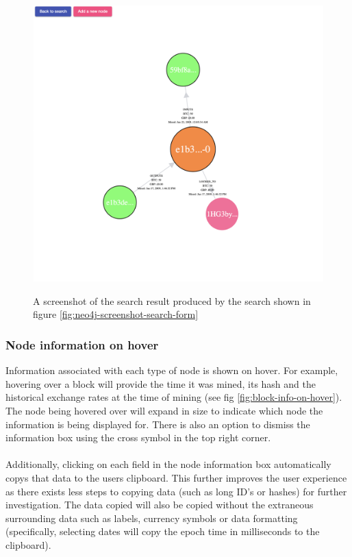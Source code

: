 \begin{figure}[h!]
  \centering
  \includegraphics[width = 15cm]{./figures/ui-screenshots/graph-basic}\\[0.5cm] 
  \caption{A screenshot of the search result produced by the search shown in figure \ref{fig:neo4j-screenshot-search-form}}
  \label{fig:neo4j-screenshot-basic-address-nodes}
\end{figure}

\subsubsection{Node information on hover}
Information associated with each type of node is shown on hover. For example, hovering over a block will provide the time it was mined, its hash and the historical exchange rates at the time of mining (see fig \ref{fig:block-info-on-hover}). The node being hovered over will expand in size to indicate which node the information is being displayed for. There is also an option to dismiss the information box using the cross symbol in the top right corner. 
\\\\
Additionally, clicking on each field in the node information box automatically copys that data to the users clipboard. This further improves the user experience as there exists less steps to copying data (such as long ID's or hashes) for further investigation. The data copied will also be copied without the extraneous surrounding data such as labels, currency symbols or data formatting (specifically, selecting dates will copy the epoch time in milliseconds to the clipboard). 

